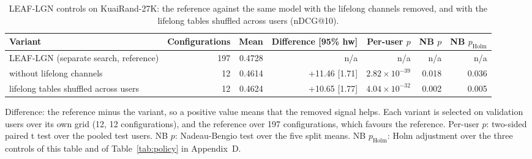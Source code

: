 \begin{table}[tbp]
\centering
\footnotesize
\caption{LEAF-LGN controls on KuaiRand-27K: the reference against the same model with the lifelong channels removed, and with the lifelong tables shuffled across users (nDCG@10).}
\label{tab:leafctl-lgn}
\begin{adjustbox}{max width=\linewidth}
\begin{tabular}{lrrrrrr}
\toprule
Variant & Configurations & Mean & Difference [95\% hw] & Per-user $p$ & NB $p$ & NB $p_{\mathrm{Holm}}$ \\
\midrule
LEAF-LGN (separate search, reference) & 197 & 0.4728 & n/a & n/a & n/a & n/a \\
\midrule
without lifelong channels & 12 & 0.4614 & +11.46 [1.71] & $2.82\times10^{-39}$ & 0.018 & 0.036 \\
lifelong tables shuffled across users & 12 & 0.4624 & +10.65 [1.77] & $4.04\times10^{-32}$ & 0.002 & 0.005 \\
\bottomrule
\end{tabular}
\end{adjustbox}
\par\smallskip
\begin{minipage}{\linewidth}\raggedright\footnotesize Difference: the reference minus the variant, so a positive value means that the removed signal helps. Each variant is selected on validation users over its own grid (12, 12 configurations), and the reference over 197 configurations, which favours the reference. Per-user $p$: two-sided paired t test over the pooled test users. NB $p$: Nadeau-Bengio test over the five split means. NB $p_{\mathrm{Holm}}$: Holm adjustment over the three controls of this table and of Table~\ref{tab:policy} in Appendix~D.\end{minipage}
\end{table}
